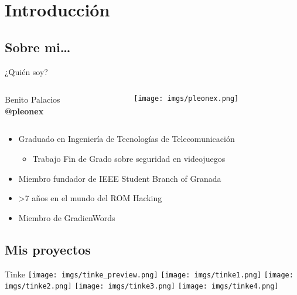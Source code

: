 \section{Introducción}
\subsection{Sobre mi\ldots}
\begin{frame}{¿Quién soy?}
    \begin{columns}
    \begin{column}{0.75\textwidth}
        \Large
        Benito Palacios \\
        \textbf{@pleonex}
    \end{column}
    \begin{column}{0.25\textwidth}
        \texttt{[image: imgs/pleonex.png]}
    \end{column}
    \end{columns}

    \vfill{}
    \setlength{\leftmargini}{0em}
    \begin{itemize}
        \item<2-> Graduado en Ingeniería de Tecnologías de Telecomunicación
        \begin{itemize}
            \item <2-> Trabajo Fin de Grado sobre seguridad en videojuegos
        \end{itemize}
        \item<3-> Miembro fundador de IEEE Student Branch of Granada
        \item<4-> \textgreater 7 años en el mundo del ROM Hacking
        \item<5-> Miembro de GradienWords
    \end{itemize}
\end{frame}

\subsection{Mis proyectos}
\begin{frame}{Tinke}
    \centering
    \texttt{[image: imgs/tinke\_preview.png]}
    \vfill
    \texttt{[image: imgs/tinke1.png]}
    \hfill
    \texttt{[image: imgs/tinke2.png]}
    \hfill
    \texttt{[image: imgs/tinke3.png]}
    \hfill
    \texttt{[image: imgs/tinke4.png]}
\end{frame}

